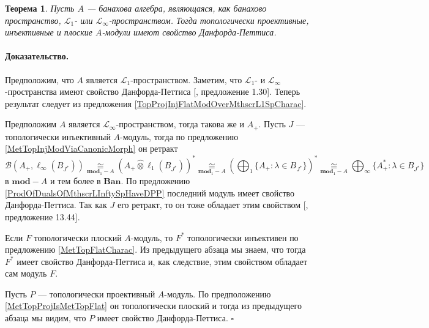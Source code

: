 \documentclass[12pt]{article}
\newcommand{\projtens}{\mathbin{\widehat{\otimes}}}
\newcommand{\isom}[1]{\mathop{\mathbin{\cong}}\limits_{#1}}
\newtheorem{theorem}{Теорема}[section]
\renewenvironment{proof}{\paragraph{Доказательство.}}{\hfill$\square$\medskip}
\begin{document}
\begin{theorem}\label{TopProjInjFlatModOverMthscrL1OrLInftySpHaveDPP} Пусть $A$ --- банахова алгебра, являющаяся, как банахово пространство, $\mathscr{L}_1$- или $\mathscr{L}_\infty$-пространством. Тогда топологически проективные, инъективные и плоские $A$-модули имеют свойство Данфорда-Петтиса.
\end{theorem}
\begin{proof} Предположим, что $A$ является $\mathscr{L}_1$-пространством. Заметим, что $\mathscr{L}_1$- и $\mathscr{L}_\infty$-пространства имеют свойство Данфорда-Петтиса [\cite{BourgNewClOfLpSp}, предложение 1.30]. Теперь результат следует из предложения \ref{TopProjInjFlatModOverMthscrL1SpCharac}.

Предположим $A$ является $\mathscr{L}_\infty$-пространством, тогда такова же и $A_+$. Пусть $J$ --- топологически инъективный $A$-модуль, тогда по предложению \ref{MetTopInjModViaCanonicMorph} он ретракт
$$
\mathcal{B}(A_+,\ell_\infty(B_{J^*}))\isom{\mathbf{mod}_1-A}(A_+\projtens\ell_1(B_{J^*}))^*\isom{\mathbf{mod}_1-A}
\left(\bigoplus\nolimits_1\{ A_+:\lambda\in B_{J^*}\}\right)^*\isom{\mathbf{mod}_1-A}
\bigoplus\nolimits_\infty\{ A_+^*:\lambda\in B_{J^*}\}
$$ 
в $\mathbf{mod}-A$ и тем более в $\mathbf{Ban}$. По предложению \ref{ProdOfDualsOfMthscrLInftySpHaveDPP} последний модуль имеет свойство Данфорда-Петтиса. Так как $J$ его ретракт, то он тоже обладает этим свойством [\cite{FabHabBanSpTh}, предложение 13.44]. 

Если $F$ топологически плоский $A$-модуль, то $F^*$ топологически инъективен по предложению \ref{MetTopFlatCharac}. Из предыдущего абзаца мы знаем, что тогда $F^*$ имеет свойство Данфорда-Петтиса и, как следствие, этим свойством обладает сам модуль $F$.

Пусть $P$ --- топологически проективный $A$-модуль. По предположению \ref{MetTopProjIsMetTopFlat} он топологически плоский и тогда из предыдущего абзаца мы видим, что $P$ имеет свойство Данфорда-Петтиса.
\end{proof}
\end{document}
